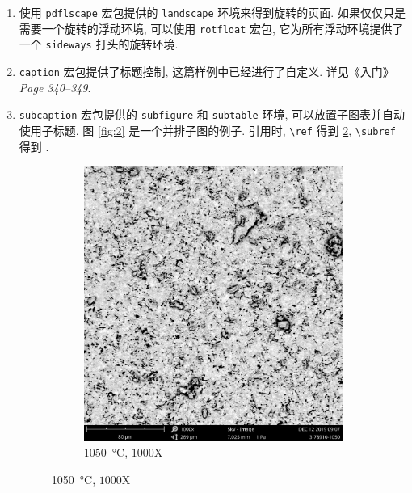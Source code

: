 \documentclass[UTF8,no-math]{ctexart}
\numberwithin{enumi}{section}
\begin{document}
\begin{enumerate}
\begin{itemize}
            \item \verb|\resizebox{h-length}{v-length}{text}| 放缩内容到指定宽高. 其中一个尺寸可以设置为叹号 \texttt{!} 来表示随另一个量放缩. 
            \item \verb|\rotatebox[options]{angle}{text}| 逆时针旋转内容. 选项可以设置 \verb|origin| 和 \verb|units|.
        \end{itemize}
        \item 使用 \verb|pdflscape| 宏包提供的 \verb|landscape| 环境来得到旋转的页面. 如果仅仅只是需要一个旋转的浮动环境, 可以使用 \verb|rotfloat| 宏包, 它为所有浮动环境提供了一个 \verb|sideways| 打头的旋转环境. 
        \item \texttt{caption} 宏包提供了标题控制, 这篇样例中已经进行了自定义. 详见《入门》\emph{Page 340--349}.
        \item \texttt{subcaption} 宏包提供的 \verb|subfigure| 和 \verb|subtable| 环境, 可以放置子图表并自动使用子标题. 图 \ref{fig:2} 是一个并排子图的例子. 引用时, \verb|\ref| 得到 \ref{fig:2/a}, \verb|\subref| 得到 .
        \begin{figure}[htbp]
            \centering
            \begin{subfigure}[b]{0.27\textwidth}
                \centering
                \includegraphics[width=0.9\linewidth]{fig/3-78910-10500001.jpg}
                \caption{\SI{1050}{\celsius}, $1000\text{X}$}
                \label{fig:2/a}

\end{subfigure}
\end{figure}
\end{enumerate}
\end{document}
